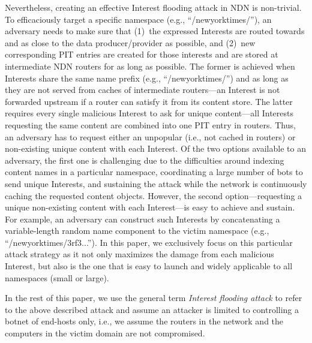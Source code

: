 \documentclass[10pt,conference]{IEEEtran}
\newcommand{\ndnName}[1]{``{\nicettfont #1}''}
\begin{document}
Nevertheless, creating an effective Interest flooding attack in NDN is non-trivial.
To efficaciously target a specific namespace (e.g., \ndnName{/newyorktimes/}), an adversary needs to make sure that (1)~the expressed Interests are routed towards and as close to the data producer/provider as possible, and (2)~new corresponding PIT entries are created for those interests and are stored at intermediate NDN routers for as long as possible. The former is achieved when Interests share the same name prefix (e.g., \ndnName{/newyorktimes/}) and as long as they are not served from caches of intermediate routers---an Interest is not forwarded upstream if a router can satisfy it from its content store. The latter requires every single malicious Interest to ask for unique content---all Interests requesting the same content are combined into one PIT entry in routers. Thus, an adversary has to request either an unpopular (i.e., not cached in routers) or non-existing unique content with each Interest. Of the two options available to an adversary, the first one is challenging due to the difficulties around indexing content names in a particular namespace, coordinating a large number of bots to send unique Interests, and sustaining the attack while the network is continuously caching the requested content objects. However, the second option---requesting a unique non-existing content with each Interest---is easy to achieve and sustain. For example, an adversary can construct such Interests by concatenating a variable-length random name component to the victim namespace (e.g., \ndnName{/newyorktimes/3rf3...}). In this paper, we exclusively focus on this particular attack strategy as it not only maximizes the damage from each malicious Interest, but also is the one that is easy to launch and widely applicable to all namespaces (small or large). %

In the rest of this paper, we use the general term \emph{Interest flooding attack} to refer to the above described attack and assume an attacker is limited to controlling a botnet of end-hosts only, i.e., we assume the routers in the network and the computers in the victim domain are not compromised.

\end{document}
